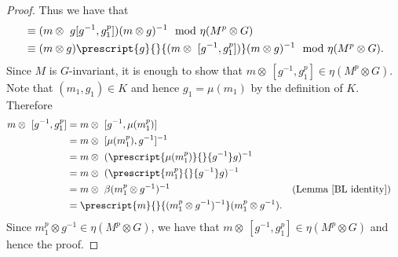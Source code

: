 \documentclass[12pt]{elsarticle}
\newtheorem*{main corollary*}{Main Corollary}
\theoremstyle{definition}
\begin{document}
\begin{proof}
    Thus we have that
	\begin{align*}
		[\{k\},m \otimes g]&\equiv ( m \otimes \ g[g^{-1},g_1^p])(m \otimes g)^{-1} \mod \eta(M^p\otimes G) \\
		& \equiv (m \otimes g) \prescript{g}{}{( m \otimes \ [g^{-1},g_1^p])}(m \otimes g)^{-1} \mod \eta(M^p\otimes G).
	\end{align*}
	Since $M$ is $G$-invariant, it is enough to show that $m \otimes \ [g^{-1},g_1^p] \in \eta(M^p \otimes G)$. Note that $(m_1,g_1) \in K$ and hence $g_1=\mu(m_1)$ by the definition of $K$. Therefore
	\begin{align*}
		m \otimes \ [g^{-1},g_1^p]&=m \otimes \ [g^{-1},\mu(m_1^p)] \\
		&= m \otimes \ [\mu(m_1^p),g^{-1}]^{-1} \\
		&= m \otimes \ (\prescript{\mu(m_1^p)}{}{g^{-1}}g)^{-1} \\
		&= m \otimes \ (\prescript{m_1^p}{}{g^{-1}}g)^{-1} \\
		&= m \otimes \ \beta(m_1^p \otimes g^{-1})^{-1}  && \text{(Lemma } \ref{BL identity}) \\
		&=\prescript{m}{}{(m_1^p \otimes g^{-1})^{-1}}(m_1^p \otimes g^{-1}).
	\end{align*}
	Since $m_1^p \otimes g^{-1} \in \eta(M^p \otimes G)$, we have that $m \otimes \ [g^{-1},g_1^p] \in \eta(M^p \otimes G)$ and hence the proof.
\end{proof}


\end{document}
